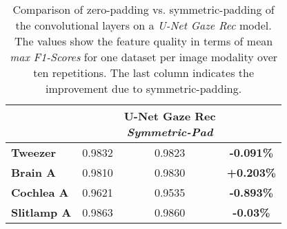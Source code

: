 \begin{table}[!htbp]
   \centering
   \caption[Zero vs. symmetric padding]{Comparison of zero-padding vs. symmetric-padding of the convolutional layers on a \textit{U-Net Gaze Rec} model. The values show the feature quality in terms of mean \textit{max F1-Scores} for one dataset per image modality over ten repetitions. The last column indicates the improvement due to symmetric-padding.}
   \small
   \begin{tabular}{l|c|c||c|}
      \toprule
       & \Gape[6pt][6pt]{\rotatebox[origin=cB]{90}{\parbox[t]{2.6cm}{U-Net Gaze Rec \\ \textit{\textbf{Zero-Pad}\hspace*{\fill}}}}}
       & \rotatebox[origin=cB]{90}{\parbox[t]{2.6cm}{U-Net Gaze Rec \\ \textit{\textbf{Symmetric-Pad}\hspace*{\fill}}}}
       & \rotatebox[origin=cB]{90}{\parbox[t]{2.6cm}{\textbf{Improvement\hspace*{\fill}}}} \\
      \midrule
      \textbf{Tweezer} & 0.9832 & 0.9823  & \textbf{-0.091\%} \\\midrule
      \textbf{Brain A} & 0.9810 & 0.9830 &  \textbf{+0.203\%} \\\midrule
      \textbf{Cochlea A} & 0.9621 & 0.9535 & \textbf{-0.893\%} \\\midrule
      \textbf{Slitlamp A} & 0.9863 & 0.9860 & \textbf{-0.03\%} \\
      \bottomrule
   \end{tabular}
   \label{tab:zero_vs_sym_padd}
\end{table}

